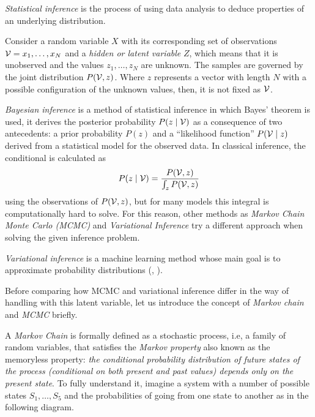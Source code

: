 
\emph{Statistical inference} is the process of using data analysis to deduce properties of an underlying distribution.

Consider a random variable \(X\) with its corresponding set of observations \(\mathcal{V} = x_{1},\dots, x_{N}\) and a \emph{hidden or latent variable} \(Z\), which means that it is unobserved and the values \(z_{1}, \dots, z_{N}\) are unknown. The samples are governed by the joint distribution \(P(\mathcal{V}, z)\). Where \(z\) represents a vector with length \(N\) with a possible configuration of the unknown values, then, it is not fixed as \(\mathcal{V}\).

\emph{Bayesian inference} is a method of statistical inference in which Bayes' theorem is used, it derives the posterior probability \(P(z \mid \mathcal{V})\) as a consequence of two antecedents: a prior probability \(P(z)\) and a ``likelihood function'' \(P(\mathcal{V} \mid z)\)  derived from a statistical model for the observed data. In classical inference, the conditional is calculated as
\[
  P(z \mid \mathcal{V}) = \frac{P(\mathcal{V}, z)}{\int_{z} P(\mathcal{V},z)}
\]
using the observations of \(P(\mathcal{V},z)\), but for many models this integral is computationally hard to solve. For this reason, other methods as \emph{Markov Chain Monte Carlo (MCMC)} and \emph{Variational Inference} try a different approach when solving the given inference problem.

\emph{Variational inference} is a machine learning method whose main goal is to approximate probability distributions (\cite{jordan1999introduction}, \cite{wainwright}).

Before comparing how MCMC and variational inference differ in the way of handling with this latent variable, let us introduce the concept of \emph{Markov chain} and \emph{MCMC} briefly.

A \emph{Markov Chain} is formally defined as a stochastic process, i.e, a family of random variables, that satisfies the \emph{Markov property} also known as the memoryless property: \textit{the conditional probability distribution of future states of the process (conditional on both present and past values) depends only on the present state}. To fully understand it, imagine a system with a number of possible states \(S_{1},\dots,S_{5}\) and the probabilities of going from one state to another as in the following diagram.

\begin{center}
\end{center}

